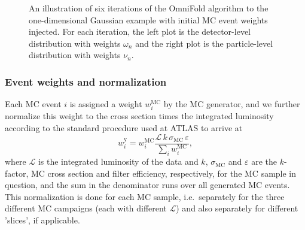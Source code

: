 \begin{figure}[h!]
\caption{An illustration of six iterations of the OmniFold algorithm to the one-dimensional Gaussian example with initial MC event weights injected.  For each iteration, the left plot is the detector-level distribution with weights $\omega_n$ and the right plot is the particle-level distribution with weights $\nu_n$.}
\label{fig:gaussian:MCiterations}
\end{figure}

\clearpage

\subsubsection{Event weights and normalization}
\label{sec:weights}

Each MC event $i$ is assigned a weight $w^\mathrm{MC}_i$ by the MC generator, and we further normalize this weight to the cross section times the integrated luminosity according to the standard procedure used at ATLAS to arrive at
\begin{equation}
  \label{eq:mc-norm}
  w^\mathrm{y}_i = w^\mathrm{MC}_i \frac{\mathcal{L}\,k\,\sigma_\mathrm{MC}\,\varepsilon}{\sum_i w^\mathrm{MC}_i},
\end{equation} 
where $\mathcal{L}$ is the integrated luminosity of the data and $k$, $\sigma_\mathrm{MC}$ and $\varepsilon$ are the $k$-factor, MC cross section and filter efficiency, respectively, for the MC sample in question, and the sum in the denominator runs over all generated MC events. This normalization is done for each MC sample, i.e.\ separately for the three different MC campaigns (each with different $\mathcal{L}$) and also separately for different 'slices', if applicable.

